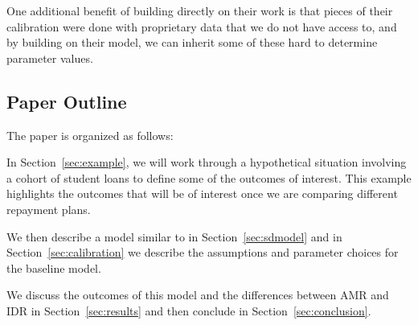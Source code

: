   One additional benefit of building directly on their work is that pieces of their calibration were
  done with proprietary data that we do not have access to, and by building on their model, we can
  inherit some of these hard to determine parameter values.


\subsection{Paper Outline}

  The paper is organized as follows:

  In Section~\ref{sec:example}, we will work through a hypothetical situation involving a cohort
  of student loans to define some of the outcomes of interest. This example highlights the outcomes
  that will be of interest once we are comparing different repayment plans.

  We then describe a model similar to \cite{HendricksLeukhina2017} in Section~\ref{sec:sdmodel} and in
  Section~\ref{sec:calibration} we describe the assumptions and parameter choices for the baseline
  model.

  We discuss the outcomes of this model and the differences between AMR and IDR in
  Section~\ref{sec:results} and then conclude in Section~\ref{sec:conclusion}.
